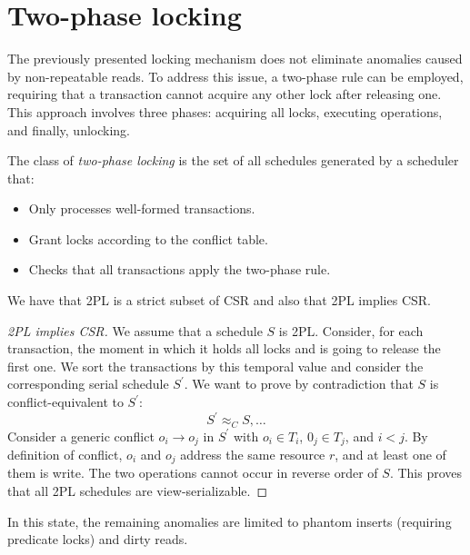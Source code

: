 \section{Two-phase locking}

The previously presented locking mechanism does not eliminate anomalies caused by non-repeatable reads. 
To address this issue, a two-phase rule can be employed, requiring that a transaction cannot acquire any other lock after releasing one. 
This approach involves three phases: acquiring all locks, executing operations, and finally, unlocking.
\begin{definition}
    The class of \emph{two-phase locking} is the set of all schedules generated by a scheduler that: 
    \begin{itemize}
        \item Only processes well-formed transactions. 
        \item Grant locks according to the conflict table. 
        \item Checks that all transactions apply the two-phase rule.             
    \end{itemize}
\end{definition}
We have that 2PL is a strict subset of CSR and also that 2PL implies CSR. 
\begin{proof}[2PL implies CSR]
    We assume that a schedule $S$ is 2PL. Consider, for each transaction, the moment in which it holds all locks and is going to release the first one. 
    We sort the transactions by this temporal value and consider the corresponding serial schedule $S^{'}$. 
    We want to prove by contradiction that $S$ is conflict-equivalent to $S^{'}$: 
    \[S^{'}\approx_CS,\dots\]
    Consider a generic conflict $o_i \rightarrow o_j$ in $S^{'}$ with $o_i \in T_i$, $0_j \in T_j$, and $i<j$. 
    By definition of conflict, $o_i$ and $o_j$ address the same resource $r$, and at least one of them is write. 
    The two operations cannot occur in reverse order of $S$. 
    This proves that all 2PL schedules are view-serializable. 
\end{proof}
In this state, the remaining anomalies are limited to phantom inserts (requiring predicate locks) and dirty reads.